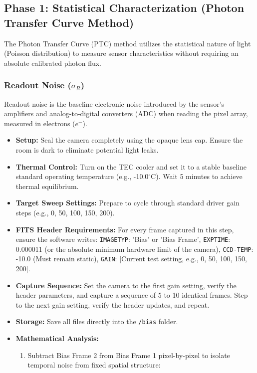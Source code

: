 \documentclass[11pt,a4paper]{article}
\begin{document}
\subsection{Phase 1: Statistical Characterization (Photon Transfer Curve Method)}
The Photon Transfer Curve (PTC) method utilizes the statistical nature of light (Poisson distribution) to measure sensor characteristics without requiring an absolute calibrated photon flux.

\subsubsection{Readout Noise ($\sigma_R$)}
Readout noise is the baseline electronic noise introduced by the sensor's amplifiers and analog-to-digital converters (ADC) when reading the pixel array, measured in electrons ($e^-$).
\begin{itemize}[leftmargin=*]
    \item \textbf{Setup:} Seal the camera completely using the opaque lens cap. Ensure the room is dark to eliminate potential light leaks.
    \item \textbf{Thermal Control:} Turn on the TEC cooler and set it to a stable baseline standard operating temperature (e.g., -10.0$^\circ$C). Wait 5 minutes to achieve thermal equilibrium.
    \item \textbf{Target Sweep Settings:} Prepare to cycle through standard driver gain steps (e.g., 0, 50, 100, 150, 200).
    \item \textbf{FITS Header Requirements:} For every frame captured in this step, ensure the software writes: \texttt{IMAGETYP}: 'Bias' or 'Bias Frame', \texttt{EXPTIME}: 0.000011 (or the absolute minimum hardware limit of the camera), \texttt{CCD-TEMP}: -10.0 (Must remain static), \texttt{GAIN}: [Current test setting, e.g., 0, 50, 100, 150, 200].
    \item \textbf{Capture Sequence:} Set the camera to the first gain setting, verify the header parameters, and capture a sequence of 5 to 10 identical frames. Step to the next gain setting, verify the header updates, and repeat.
    \item \textbf{Storage:} Save all files directly into the \texttt{/bias} folder.
    \item \textbf{Mathematical Analysis:} 
        \begin{enumerate}
            \item Subtract Bias Frame 2 from Bias Frame 1 pixel-by-pixel to isolate temporal noise from fixed spatial structure: 

\end{enumerate}
\end{itemize}
\end{document}
